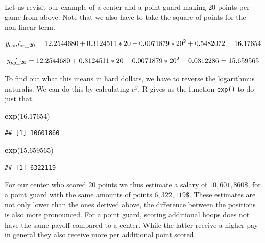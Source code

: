 \documentclass[
]{book}
\newenvironment{Shaded}{\begin{snugshade}}{\end{snugshade}}
\newcommand{\FloatTok}[1]{\textcolor[rgb]{0.00,0.00,0.81}{#1}}
\newcommand{\FunctionTok}[1]{\textcolor[rgb]{0.13,0.29,0.53}{\textbf{#1}}}
\newcommand{\NormalTok}[1]{#1}
\begin{document}
Let us revisit our example of a center and a point guard making \(20\)
points per game from above. Note that we also have to take the square of
points for the non-linear term.

\[\hat{y_{center\_20}} = 12.2544680 + 0.3124511 * 20 - 0.0071879 * 20^2 + 0.5482072 \\
= 16.17654\]

\[\hat{y_{pg\_20}} = 12.2544680 + 0.3124511 * 20 - 0.0071879 * 20^2 + 0.0312286 \\
= 15.659565\]

To find out what this means in hard dollars, we have to reverse the
logarithmus naturalis. We can do this by calculating \(e^{\hat{y}}\). R
gives us the function \texttt{exp()} to do just that.

\begin{Shaded}
\begin{Highlighting}[]
\FunctionTok{exp}\NormalTok{(}\FloatTok{16.17654}\NormalTok{)}
\end{Highlighting}
\end{Shaded}

\begin{verbatim}
## [1] 10601860
\end{verbatim}

\begin{Shaded}
\begin{Highlighting}[]
\FunctionTok{exp}\NormalTok{(}\FloatTok{15.659565}\NormalTok{)}
\end{Highlighting}
\end{Shaded}

\begin{verbatim}
## [1] 6322119
\end{verbatim}

For our center who scored \(20\) points we thus estimate a salary of
\(10,601,860\$\), for a point guard with the same amounts of points
\(6,322,119\$\). These estimates are not only lower than the ones derived
above, the difference between the positions is also more pronounced. For
a point guard, scoring additional hoops does not have the same payoff
compared to a center. While the latter receive a higher pay in general
they also receive more per additional point scored.
\end{document}
